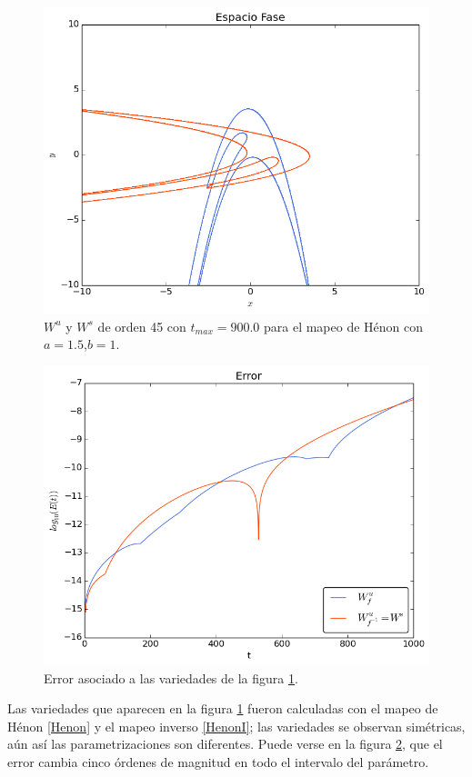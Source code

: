 \begin{figure}[H]
\centering
\includegraphics[scale=0.6]{henon1}
\caption{$W^{u}$ y $W^{s}$ de orden 45 con $t_{max}=900.0$ para el mapeo de Hénon con $a=1.5$,$b=1$.}
\label{Henon1}
\end{figure}

\begin{figure}[H]
\centering
\includegraphics[scale=0.6]{ErrorHenon1}
\caption{Error asociado a las variedades de la figura \ref{Henon1}.}
\label{ErrorHenon1}
\end{figure}
Las variedades que aparecen en la figura \ref{Henon1} fueron calculadas con el mapeo de Hénon \eqref{Henon} y el mapeo inverso \eqref{HenonI}; las variedades se observan simétricas, aún así las parametrizaciones son diferentes. Puede verse en la figura \ref{ErrorHenon1}, que el error cambia cinco órdenes de magnitud en todo el intervalo del parámetro.\\

